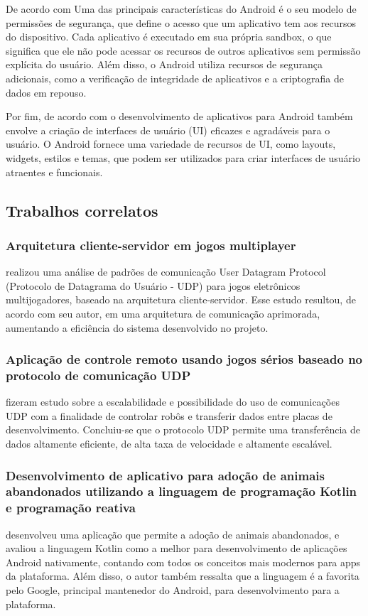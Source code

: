 \documentclass[12pt]{article}
\begin{document}
De acordo com \cite{gazzola2020desenvolvimento} Uma das principais características do Android é o seu modelo de permissões de segurança, que define o acesso que um aplicativo tem aos recursos do dispositivo. Cada aplicativo é executado em sua própria sandbox, o que significa que ele não pode acessar os recursos de outros aplicativos sem permissão explícita do usuário. Além disso, o Android utiliza recursos de segurança adicionais, como a verificação de integridade de aplicativos e a criptografia de dados em repouso.

Por fim, de acordo com \cite{sarkar2020android} o desenvolvimento de aplicativos para Android também envolve a criação de interfaces de usuário (UI) eficazes e agradáveis para o usuário. O Android fornece uma variedade de recursos de UI, como layouts, widgets, estilos e temas, que podem ser utilizados para criar interfaces de usuário atraentes e funcionais.

\subsection{Trabalhos correlatos}

\subsubsection{Arquitetura cliente-servidor em jogos multiplayer}

\cite{picoli2011arquitetura} realizou uma análise de padrões de comunicação  User Datagram Protocol (Protocolo de Datagrama do Usuário - UDP) para jogos eletrônicos multijogadores, baseado na arquitetura cliente-servidor. Esse estudo resultou, de acordo com seu autor, em uma arquitetura de comunicação aprimorada, aumentando a eficiência do sistema desenvolvido no projeto.

\subsubsection{Aplicação de controle remoto usando jogos sérios baseado no protocolo de comunicação UDP}

\cite{moreno2019aplicaccao} fizeram estudo sobre a escalabilidade e possibilidade do uso de comunicações UDP com a finalidade de controlar robôs e transferir dados entre placas de desenvolvimento. Concluiu-se que o protocolo UDP permite uma transferência de dados altamente eficiente, de alta taxa de velocidade e altamente escalável.

\subsubsection{Desenvolvimento de aplicativo para adoção de animais abandonados utilizando a linguagem de programação Kotlin e programação reativa}
\cite{silva2017desenvolvimento} desenvolveu uma aplicação que permite a adoção de animais abandonados, e avaliou a linguagem Kotlin como a melhor para desenvolvimento de aplicações Android nativamente, contando com todos os conceitos mais modernos para apps da plataforma. Além disso, o autor também ressalta que a linguagem é a favorita pelo Google, principal mantenedor do Android, para desenvolvimento para a plataforma.
\end{document}
